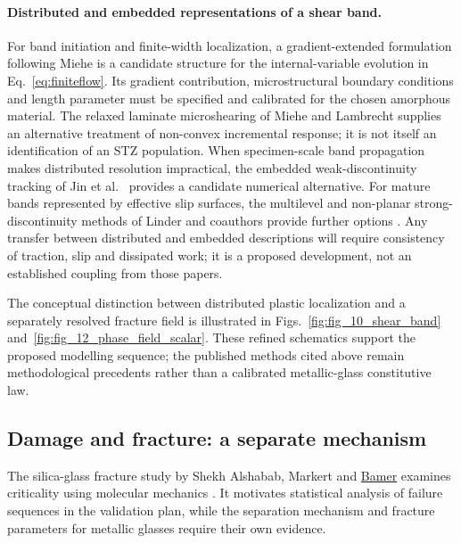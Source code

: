 \documentclass[11pt,a4paper]{article}
\begin{document}
\paragraph{Distributed and embedded representations of a shear band.}
For band initiation and finite-width localization, a gradient-extended formulation following Miehe \cite{miehegradient2014} is a candidate structure for the internal-variable evolution in Eq.~\eqref{eq:finiteflow}. Its gradient contribution, microstructural boundary conditions and length parameter must be specified and calibrated for the chosen amorphous material. The relaxed laminate microshearing of Miehe and Lambrecht \cite{miehe2003band} supplies an alternative treatment of non-convex incremental response; it is not itself an identification of an STZ population. When specimen-scale band propagation makes distributed resolution impractical, the embedded weak-discontinuity tracking of Jin et al.\ \cite{jinlinder2019} provides a candidate numerical alternative. For mature bands represented by effective slip surfaces, the multilevel and non-planar strong-discontinuity methods of Linder and coauthors provide further options \cite{linderraina2013,linderzhang2013}. Any transfer between distributed and embedded descriptions will require consistency of traction, slip and dissipated work; it is a proposed development, not an established coupling from those papers.


The conceptual distinction between distributed plastic localization and a separately resolved fracture field is illustrated in Figs.~\ref{fig:fig_10_shear_band} and~\ref{fig:fig_12_phase_field_scalar}. These refined schematics support the proposed modelling sequence; the published methods cited above remain methodological precedents rather than a calibrated metallic-glass constitutive law.

\subsection{Damage and fracture: a separate mechanism}
The silica-glass fracture study by Shekh Alshabab, Markert and \underline{Bamer} examines criticality using molecular mechanics \cite{bamercritical2024}. It motivates statistical analysis of failure sequences in the validation plan, while the separation mechanism and fracture parameters for metallic glasses require their own evidence.
\end{document}
